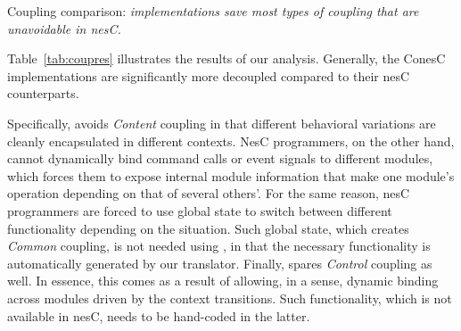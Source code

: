 \begin{table}[!tb]
\renewcommand{\arraystretch}{1.3}
\caption{Coupling comparison: \emph{\conesc implementations save most types of coupling that are unavoidable in nesC.}}
\label{tab:coupres}

\end{table}

 Table~\ref{tab:coupres} illustrates the results of our analysis. Generally,
the ConesC implementations are significantly more decoupled compared
to their nesC counterparts.

Specifically, \conesc avoids \emph{Content} coupling in that different
behavioral variations are cleanly encapsulated in different
contexts. NesC programmers, on the other hand, cannot dynamically bind
command calls or event signals to different modules, which forces them
to expose internal module information that make one module's operation
depending on that of several others'. For the same reason, nesC
programmers are forced to use global state to switch between different
functionality depending on the situation. Such global state, which
creates \emph{Common} coupling, is not needed using \conesc, in that
the necessary functionality is automatically generated by our
translator. Finally, \conesc spares \emph{Control} coupling as
well. In essence, this comes as a result of allowing, in a sense,
dynamic binding across modules driven by the context transitions. Such
functionality, which is not available in nesC, needs to be hand-coded
in the latter.




